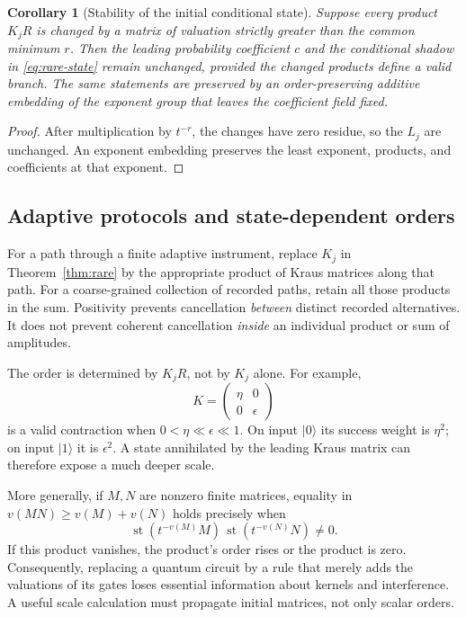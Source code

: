 \documentclass[11pt,oneside]{article}
\numberwithin{equation}{section}
\theoremstyle{plain}
\newtheorem{corollary}[theorem]{Corollary}
\theoremstyle{definition}
\theoremstyle{remark}
\newcommand{\st}{\operatorname{st}}
\newcommand{\ket}[1]{\lvert#1\rangle}
\begin{document}
\begin{corollary}[Stability of the initial conditional state]\label{cor:initialstability}
Suppose every product $K_jR$ is changed by a matrix of valuation strictly greater than the common minimum $r$. Then the leading probability coefficient $c$ and the conditional shadow in \eqref{eq:rare-state} remain unchanged, provided the changed products define a valid branch. The same statements are preserved by an order-preserving additive embedding of the exponent group that leaves the coefficient field fixed.
\end{corollary}
\begin{proof}
After multiplication by $t^{-r}$, the changes have zero residue, so the $L_j$ are unchanged. An exponent embedding preserves the least exponent, products, and coefficients at that exponent.
\end{proof}

\subsection{Adaptive protocols and state-dependent orders}
For a path through a finite adaptive instrument, replace $K_j$ in Theorem~\ref{thm:rare} by the appropriate product of Kraus matrices along that path. For a coarse-grained collection of recorded paths, retain all those products in the sum. Positivity prevents cancellation \emph{between} distinct recorded alternatives. It does not prevent coherent cancellation \emph{inside} an individual product or sum of amplitudes.

The order is determined by $K_jR$, not by $K_j$ alone. For example,
\[
 K=\begin{pmatrix}\eta&0\\0&\epsilon\end{pmatrix}
\]
is a valid contraction when $0<\eta\ll\epsilon\ll1$. On input $\ket{0}$ its success weight is $\eta^2$; on input $\ket{1}$ it is $\epsilon^2$. A state annihilated by the leading Kraus matrix can therefore expose a much deeper scale.

More generally, if $M,N$ are nonzero finite matrices, equality in
$v(MN)\ge v(M)+v(N)$ holds precisely when
\[
 \st(t^{-v(M)}M)\,\st(t^{-v(N)}N)\ne0.
\]
If this product vanishes, the product's order rises or the product is zero. Consequently, replacing a quantum circuit by a rule that merely adds the valuations of its gates loses essential information about kernels and interference. A useful scale calculation must propagate initial matrices, not only scalar orders.
\end{document}
